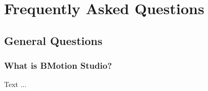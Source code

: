 \chapter{Frequently Asked Questions}
\label{faq}

\section{General Questions}

\subsection{What is BMotion Studio?}

Text ...
